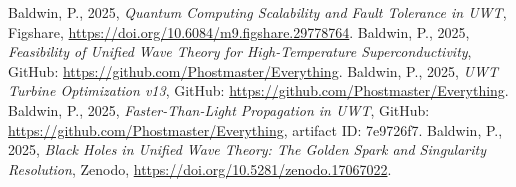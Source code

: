 \documentclass{article}
\begin{document}
\begin{thebibliography}{9}
 Baldwin, P., 2025, \textit{Quantum Computing Scalability and Fault Tolerance in UWT}, Figshare, \url{https://doi.org/10.6084/m9.figshare.29778764}.
 Baldwin, P., 2025, \textit{Feasibility of Unified Wave Theory for High-Temperature Superconductivity}, GitHub: \url{https://github.com/Phostmaster/Everything}.
 Baldwin, P., 2025, \textit{UWT Turbine Optimization v13}, GitHub: \url{https://github.com/Phostmaster/Everything}.
 Baldwin, P., 2025, \textit{Faster-Than-Light Propagation in UWT}, GitHub: \url{https://github.com/Phostmaster/Everything}, artifact ID: 7e9726f7.
 Baldwin, P., 2025, \textit{Black Holes in Unified Wave Theory: The Golden Spark and Singularity Resolution}, Zenodo, \url{https://doi.org/10.5281/zenodo.17067022}.
\end{thebibliography}
\end{document}
